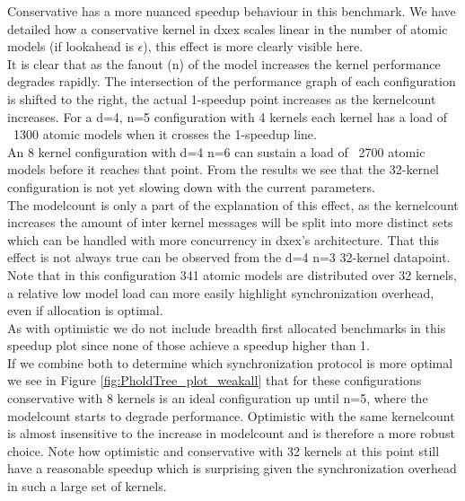 Conservative has a more nuanced speedup behaviour in this benchmark. We have detailed how a conservative kernel in dxex scales linear in the number of atomic models (if lookahead is $\epsilon$), this effect is more clearly visible here. \\
It is clear that as the fanout (n) of the model increases the kernel performance degrades rapidly. The intersection of the performance graph of each configuration is shifted to the right, the actual 1-speedup point increases as the kernelcount increases. For a d=4, n=5 configuration with 4 kernels each kernel has a load of ~1300 atomic models when it crosses the 1-speedup line. \\
An 8 kernel configuration with d=4 n=6 can sustain a load of ~2700 atomic models before it reaches that point. From the results we see that the 32-kernel configuration is not yet slowing down with the current parameters. \\
The modelcount is only a part of the explanation of this effect, as the kernelcount increases the amount of inter kernel messages will be split into more distinct sets which can be handled with more concurrency in dxex's architecture. 
That this effect is not always true can be observed from the d=4 n=3 32-kernel datapoint. Note that in this configuration 341 atomic models are distributed over 32 kernels, a relative low model load can more easily highlight synchronization overhead, even if allocation is optimal.\\
As with optimistic we do not include breadth first allocated benchmarks in this speedup plot since none of those achieve a speedup higher than 1.
\\
If we combine both to determine which synchronization protocol is more optimal we see in Figure \ref{fig:PholdTree_plot_weakall} that for these configurations conservative with 8 kernels is an ideal configuration up until n=5, where the modelcount starts to degrade performance. Optimistic with the same kernelcount is almost insensitive to the increase in modelcount and is therefore a more robust choice. Note how optimistic and conservative with 32 kernels at this point still have a reasonable speedup which is surprising given the synchronization overhead in such a large set of kernels.
